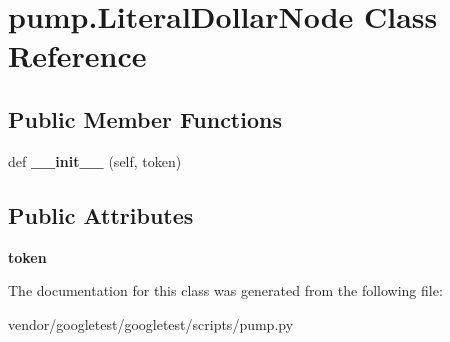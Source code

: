 \hypertarget{classpump_1_1LiteralDollarNode}{}\section{pump.\+Literal\+Dollar\+Node Class Reference}
\label{classpump_1_1LiteralDollarNode}
\subsection*{Public Member Functions}
\begin{DoxyCompactItemize}
\item 
def {\bfseries \+\_\+\+\_\+init\+\_\+\+\_\+} (self, token)\hypertarget{classpump_1_1LiteralDollarNode_a181cccad8a48f7dfdd0716e427897e0b}{}\label{classpump_1_1LiteralDollarNode_a181cccad8a48f7dfdd0716e427897e0b}

\end{DoxyCompactItemize}
\subsection*{Public Attributes}
\begin{DoxyCompactItemize}
\item 
{\bfseries token}\hypertarget{classpump_1_1LiteralDollarNode_ab4c6e209635b8868bcdf0fe8053431c6}{}\label{classpump_1_1LiteralDollarNode_ab4c6e209635b8868bcdf0fe8053431c6}

\end{DoxyCompactItemize}


The documentation for this class was generated from the following file\+:\begin{DoxyCompactItemize}
\item 
vendor/googletest/googletest/scripts/pump.\+py\end{DoxyCompactItemize}
